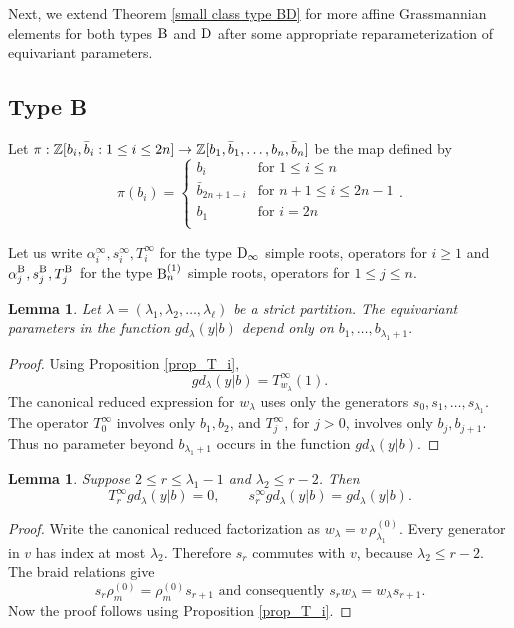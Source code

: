 \documentclass[a4paper]{amsart}
\newtheorem{lem}[thm]{Lemma}
\theoremstyle{remark}
\numberwithin{equation}{section}
\begin{document}
Next, we extend Theorem \ref{small class type BD} for more affine Grassmannian elements for both types $\mathrm{B}_{}$ and $\mathrm{D}_{}$ after some appropriate reparameterization of equivariant parameters.





\subsection{Type B}
Let $\pi:\mathbb{Z}[b_i,\bar{b}_i: 1\le i\le 2n]\to \mathbb{Z}[b_1,\bar{b}_1,\dots, b_n,\bar{b}_n]$ be the map defined by 
\[\pi(b_i)=
\begin{cases}
   b_i& \text{for } 1\leq i\leq n\\
   \bar{b}_{2n+1-i} & \text{for } n+1\leq i\leq 2n-1\\
   {b}_1 & \text{for }  i=2n\\
\end{cases}.
\]



Let us write \(\alpha_i^\infty,s_i^\infty,T_i^\infty\) for the type \(\mathrm{D}_{\infty}\) simple roots, operators for $i\geq 1$ and \(\alpha_j^{\mathrm{B}_{}},s_j^{\mathrm{B}_{}},T_j^{\mathrm{B}_{}}\) for the type \(\mathrm{B}_{n}^{(1)}\) simple roots, operators for $1\le j\le n$.

\begin{lem}\label{lem_1}
    Let $\lambda=(\lambda_1,\lambda_2,\dots,\lambda_\ell)$ be a strict partition. The equivariant parameters in the function \(gd_\lambda(y| b)\) depend only on
$b_1,\ldots,b_{\lambda_1+1}.$ 
\end{lem}
\begin{proof}
Using Proposition \ref{prop_T_i}, 
\[
gd_\lambda(y| b)=T^\infty_{w_\lambda}(1).
\]
The canonical reduced expression for \(w_\lambda\) uses only the generators $s_0,s_1,\ldots,s_{\lambda_1}.$
The operator \(T_0^\infty\) involves only \(b_1,b_2\), and \(T_j^\infty\), for \(j>0\), involves only \(b_j,b_{j+1}\). Thus no parameter beyond \(b_{\lambda_1+1}\) occurs in the function \(gd_\lambda(y| b)\). 
\end{proof}


\begin{lem}\label{lem_2}
    Suppose $
2\le r\le \lambda_1-1$ and 
$\lambda_2\le r-2$.
Then
\[
T_r^\infty gd_\lambda(y| b)=0,
\qquad
s_r^\infty gd_\lambda(y| b)=gd_\lambda(y| b).
\]
\end{lem}
\begin{proof}
    Write the canonical reduced factorization as $
w_\lambda=v\,\rho_{\lambda_1}^{(0)}.$
Every generator in \(v\) has index at most \(\lambda_2\). Therefore \(s_r\) commutes with \(v\), because \(\lambda_2\le r-2\). The braid relations give
\[
s_r\rho_m^{(0)}
=
\rho_m^{(0)}s_{r+1} \text{ and consequently }
s_rw_\lambda=w_\lambda s_{r+1}.
\]
Now the proof follows using Proposition \ref{prop_T_i}.
\end{proof}
\end{document}
